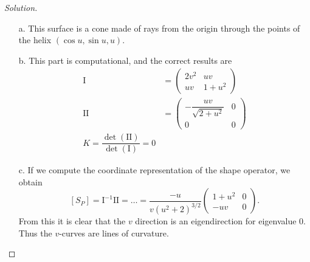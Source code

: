 \documentclass[Shifrin_Solutions_Spring_2018]{subfiles}
\begin{document}
\begin{proof}[Solution]
\begin{itemize}
\item[a.] This surface is a cone made of rays from the origin through the points of the helix $(\cos u, \sin u, u)$.

\item[b.] This part is computational, and the correct results are
\begin{align*}
\mathrm{I} & = \begin{pmatrix} 2v^2 & uv \\ uv & 1+u^2 \end{pmatrix} \\
\mathrm{II} & = \begin{pmatrix} -\dfrac{uv}{\sqrt{2+u^2}} & 0 \\ 0 & 0 \end{pmatrix} \\
K = \dfrac{\det(\mathrm{II})}{\det(\mathrm{I})} = 0
\end{align*}

\item[c.] If we compute the coordinate representation of the shape operator, we obtain
\[
\left[ S_P\right] = \mathrm{I}^{-1} \mathrm{II} = \dots = \dfrac{-u}{v(u^2+2)^{3/2}} \begin{pmatrix} 1+u^2 & 0 \\ -uv & 0 \end{pmatrix} .
\]
From this it is clear that the $v$ direction is an eigendirection for eigenvalue $0$. Thus the $v$-curves are lines of curvature.



\end{itemize}
\end{proof}
\end{document}
